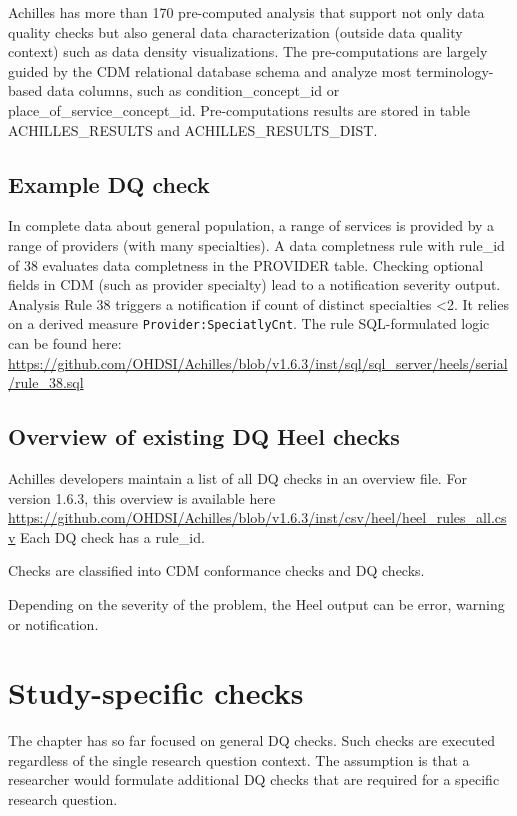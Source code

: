 \documentclass[11pt]{book}
\begin{document}
Achilles has more than 170 pre-computed analysis that support not only
data quality checks but also general data characterization (outside data
quality context) such as data density visualizations. The
pre-computations are largely guided by the CDM relational database
schema and analyze most terminology-based data columns, such as
condition\_concept\_id or place\_of\_service\_concept\_id.
Pre-computations results are stored in table ACHILLES\_RESULTS and
ACHILLES\_RESULTS\_DIST.

\subsection{Example DQ check}\label{example-dq-check}

In complete data about general population, a range of services is
provided by a range of providers (with many specialties). A data
completness rule with rule\_id of 38 evaluates data completness in the
PROVIDER table. Checking optional fields in CDM (such as provider
specialty) lead to a notification severity output. Analysis Rule 38
triggers a notification if count of distinct specialties \textless{}2.
It relies on a derived measure \texttt{Provider:SpeciatlyCnt}. The rule
SQL-formulated logic can be found here:
\url{https://github.com/OHDSI/Achilles/blob/v1.6.3/inst/sql/sql_server/heels/serial/rule_38.sql}

\subsection{Overview of existing DQ Heel
checks}\label{overview-of-existing-dq-heel-checks}

Achilles developers maintain a list of all DQ checks in an overview
file. For version 1.6.3, this overview is available here
\url{https://github.com/OHDSI/Achilles/blob/v1.6.3/inst/csv/heel/heel_rules_all.csv}
Each DQ check has a rule\_id.

Checks are classified into CDM conformance checks and DQ checks.

Depending on the severity of the problem, the Heel output can be error,
warning or notification.

\section{Study-specific checks}\label{study-specific-checks}

The chapter has so far focused on general DQ checks. Such checks are
executed regardless of the single research question context. The
assumption is that a researcher would formulate additional DQ checks
that are required for a specific research question.
\end{document}
